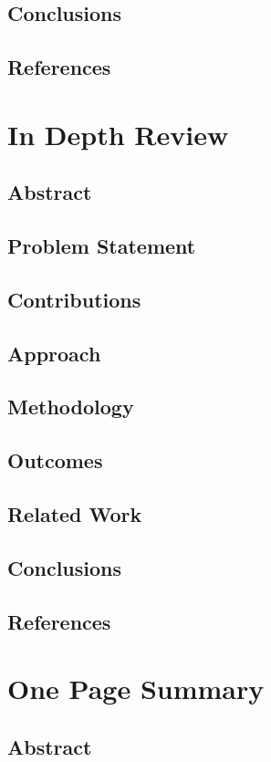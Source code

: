 \documentclass[a4paper,portrait,12pt]{article}
\begin{document}
\subsection{Conclusions}
\subsection{References}

\section{In Depth Review}
\subsection{Abstract}
\subsection{Problem Statement}
\subsection{Contributions}
\subsection{Approach}
\subsection{Methodology}
\subsection{Outcomes}
\subsection{Related Work}
\subsection{Conclusions}
\subsection{References}

\section{One Page Summary}
\subsection{Abstract}
\end{document}
